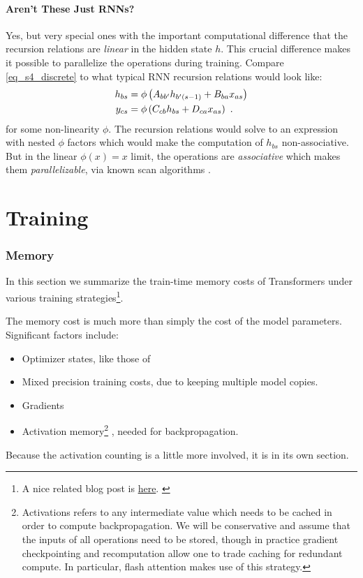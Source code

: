 \documentclass[11pt]{article}
\begin{document}
\subsection{Aren't These Just RNNs?\label{subsec_rnns_and_ssm}}

Yes, but very special ones with the important computational difference that the recursion relations
are \textit{linear} in the hidden state $ h $. This crucial difference makes it possible to
parallelize the operations during training. Compare \eqref{eq_s4_discrete} to what typical RNN
recursion relations would look like:
\begin{align}
    h  _{ bs } &= \phi \left (A  _{ b b' }h _{ b' (s-1) } + B  _{ b a }x  _{ as }\right )\nonumber\\
    y  _{ cs } &= \phi\left (C _{ c b }h  _{ bs } + D _{ c a }x  _{ as }\right ) \label{eq_rnn_comparison} \ .
\end{align}
for some non-linearity $ \phi $.  The recursion relations would solve to an expression with nested
$ \phi $ factors which would make the computation of $ h _{ bs } $ non-associative. But in the linear $
\phi(x) = x$ limit, the operations are \textit{associative} which makes them
\textit{parallelizable}, via known scan algorithms \cite{prefixSumsBlelloch}.






\newpage
\part{Training}

\section{Memory \label{sec_memory_training}}

In this section we summarize the train-time memory costs of Transformers under various training
strategies\footnote{A nice related blog post is \href{https://blog.eleuther.ai/transformer-math/}{here}. \label{foot_eleuther_math_101} }.

The memory cost is much more than simply the cost of the model
parameters. Significant factors include:
\begin{itemize}
	\item Optimizer states, like those of 
	\item Mixed precision training costs, due to keeping multiple model copies.
	\item Gradients
	\item Activation memory\footnote{Activations refers to any intermediate value which needs to be
		      cached in order to compute backpropagation. We will be conservative and assume that the inputs
		      of all operations need to be stored, though in practice gradient checkpointing and recomputation
		      allow one to trade caching for redundant compute. In particular, flash attention
		      \cite{dao2022flashattention} makes use of this strategy.} , needed for backpropagation.
\end{itemize}
Because the activation counting is a little more involved, it is in its own section.
\end{document}
